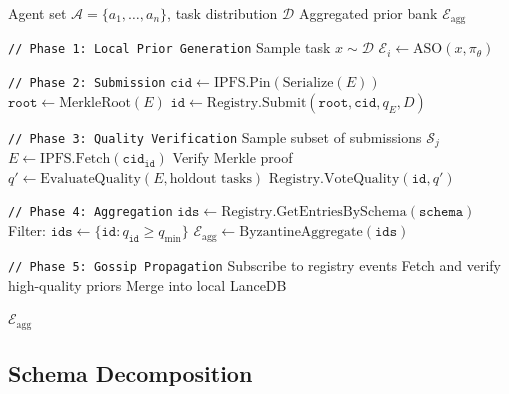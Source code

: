 \begin{algorithm}[H]
\caption{DSO Protocol: Full Lifecycle}
\label{alg:dso-lifecycle}
\begin{algorithmic}[1]
\Require Agent set $\mathcal{A} = \{a_1, \ldots, a_n\}$, task distribution $\mathcal{D}$
\Ensure Aggregated prior bank $\mathcal{E}_{\text{agg}}$

\State \texttt{// Phase 1: Local Prior Generation}
    \State Sample task $x \sim \mathcal{D}$
    \State $\mathcal{E}_i \gets \text{ASO}(x, \pi_\theta)$
\EndFor

\State \texttt{// Phase 2: Submission}
        \State $\texttt{cid} \gets \text{IPFS.Pin}(\text{Serialize}(E))$
        \State $\texttt{root} \gets \text{MerkleRoot}(E)$
        \State $\texttt{id} \gets \text{Registry.Submit}(\texttt{root}, \texttt{cid}, q_E, D)$
    \EndFor
\EndFor

\State \texttt{// Phase 3: Quality Verification}
    \State Sample subset of submissions $\mathcal{S}_j$
        \State $E \gets \text{IPFS.Fetch}(\texttt{cid}_{\texttt{id}})$
        \State Verify Merkle proof
        \State $q' \gets \text{EvaluateQuality}(E, \text{holdout tasks})$
        \State $\text{Registry.VoteQuality}(\texttt{id}, q')$
    \EndFor
\EndFor

\State \texttt{// Phase 4: Aggregation}
\State $\texttt{ids} \gets \text{Registry.GetEntriesBySchema}(\texttt{schema})$
\State Filter: $\texttt{ids} \gets \{\texttt{id} : q_{\texttt{id}} \geq q_{\min}\}$
\State $\mathcal{E}_{\text{agg}} \gets \text{ByzantineAggregate}(\texttt{ids})$

\State \texttt{// Phase 5: Gossip Propagation}
    \State Subscribe to registry events
    \State Fetch and verify high-quality priors
    \State Merge into local LanceDB
\EndFor

\State \Return $\mathcal{E}_{\text{agg}}$
\end{algorithmic}
\end{algorithm}

\subsection{Schema Decomposition}

